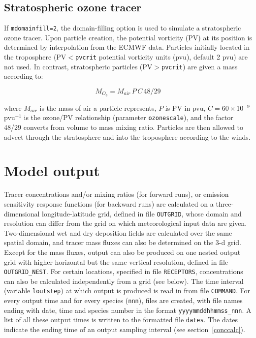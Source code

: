 \documentclass{egu}                  %
\begin{document}
\subsection{Stratospheric ozone tracer}

If \verb|mdomainfill=2|, the domain-filling option is used to simulate a
stratospheric ozone tracer.  Upon particle creation, the potential vorticity
(PV) at its position is determined by interpolation from the ECMWF data.
Particles initially located in the troposphere (PV$<$\verb|pvcrit| potential
vorticity units (pvu), default 2 pvu) are not used.  In contrast, stratospheric
particles (PV$>$\verb|pvcrit|) are given a mass according to:

\begin{equation}
M_{O_3}=M_{air}\, P \, C \, 48/29
\end{equation}

where $M_{air}$ is the mass of air a particle represents, $P$ is PV in pvu,
$C=60\times$10$^{-9}$ pvu$^{-1}$ is the ozone/PV relationship \citep{stohl2000}
(parameter \verb|ozonescale|), and the factor 48/29 converts from volume to
mass mixing ratio.  Particles are then allowed to advect through the
stratosphere and into the troposphere according to the winds.

\section{Model output}

Tracer concentrations and/or mixing ratios (for forward runs), or emission
sensitivity response functions (for backward runs) are calculated on a
three-dimensional longitude-latitude grid, defined in file \verb|OUTGRID|,
whose domain and resolution can differ from the grid on which meteorological
input data are given.  Two-dimensional wet and dry deposition fields are
calculated over the same spatial domain, and tracer mass fluxes can also be
determined on the 3-d grid.  Except for the mass fluxes, output can also be
produced on one nested output grid with higher horizontal but the same vertical
resolution, defined in file \verb|OUTGRID_NEST|.  For certain locations,
specified in file \verb|RECEPTORS|, concentrations can also be calculated
independently from a grid (see below).  The time interval (variable
\verb|loutstep|) at which output is produced is read in from file
\verb|COMMAND|.  For every output time and for every species (\verb|nnn|),
files are created, with file names ending with date, time and species number in
the format \verb|yyyymmddhhmmss_nnn|.  A list of all these output times is
written to the formatted file \verb|dates|.  The dates indicate the ending time
of an output sampling interval (see section~\ref{conccalc}).
\end{document}
